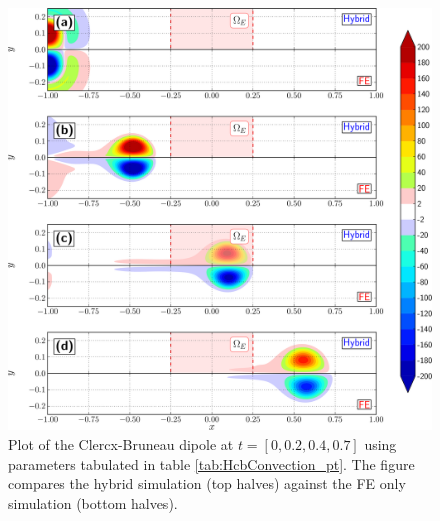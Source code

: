 	\begin{figure}[!b]
	\centering
	\includegraphics[width=\linewidth]{./figures/validation/cbConv/hybrid_doubleMonopoleConvection_contourfPlots-crop.png}
	\caption{Plot of the Clercx-Bruneau dipole at $t=[0,0.2,0.4,0.7]$ using parameters tabulated in table \ref{tab:HcbConvection_pt}. The figure compares the hybrid simulation (top halves) against the FE only simulation (bottom halves).}
	\label{fig:hybrid_doubleMonopoleConvection_contourfPlots}
	\end{figure}

